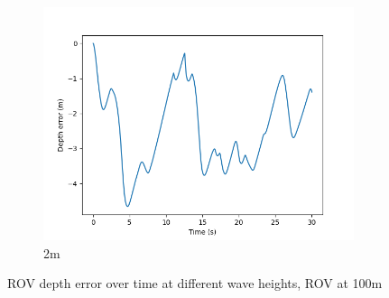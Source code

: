 \documentclass[class=article, crop=false]{standalone}
\begin{document}
\begin{figure}
\begin{subfigure}[b]{0.48\textwidth}
        \includegraphics{scenario1/rov-100m/2.0m/rov_depth_error_controlled}
        \caption{2m}
        \label{}
    \end{subfigure}

    \caption{ROV depth error over time at different wave heights, ROV at 100m}
\end{figure}
\end{document}
